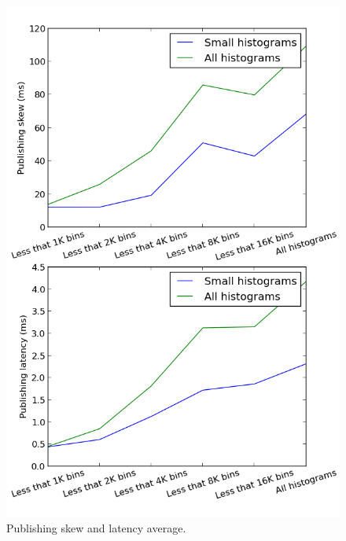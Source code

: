 \begin{figure}[ht]
\centering
\includegraphics[scale=0.5]{Images/small_vs_all.png}
\caption{Publishing skew and latency average.}
\label{fig:small_vs_all}
\end{figure}







